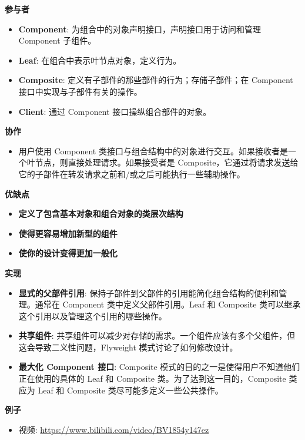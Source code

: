 \noindent\textbf{参与者}

\begin{itemize}
    \item \textbf{Component}: 为组合中的对象声明接口，声明接口用于访问和管理 Component 子组件。
    \item \textbf{Leaf}: 在组合中表示叶节点对象，定义行为。
    \item \textbf{Composite}: 定义有子部件的那些部件的行为；存储子部件；在 Component 接口中实现与子部件有关的操作。
    \item \textbf{Client}: 通过 Component 接口操纵组合部件的对象。
\end{itemize}

\noindent\textbf{协作}

\begin{itemize}
    \item 用户使用 Component 类接口与组合结构中的对象进行交互。如果接收者是一个叶节点，则直接处理请求。如果接受者是 Composite，它通过将请求发送给它的子部件在转发请求之前和/或之后可能执行一些辅助操作。
\end{itemize}

\noindent\textbf{优缺点}

\begin{itemize}
    \item \textbf{定义了包含基本对象和组合对象的类层次结构}
    \item \textbf{使得更容易增加新型的组件}
    \item \textbf{使你的设计变得更加一般化}
\end{itemize}

\noindent\textbf{实现}

\begin{itemize}
    \item \textbf{显式的父部件引用}: 保持子部件到父部件的引用能简化组合结构的便利和管理。通常在 Component 类中定义父部件引用。Leaf 和 Composite 类可以继承这个引用以及管理这个引用的哪些操作。
    \item \textbf{共享组件}: 共享组件可以减少对存储的需求。一个组件应该有多个父组件，但这会导致二义性问题，Flyweight 模式讨论了如何修改设计。
    \item \textbf{最大化 Component 接口}: Composite 模式的目的之一是使得用户不知道他们正在使用的具体的 Leaf 和 Composite 类。为了达到这一目的，Composite 类应为 Leaf 和 Composite 类尽可能多定义一些公共操作。
\end{itemize}

\noindent\textbf{例子}

\begin{itemize}
    \item 视频: \url{https://www.bilibili.com/video/BV1854y147ez}
\end{itemize}



\newpage
